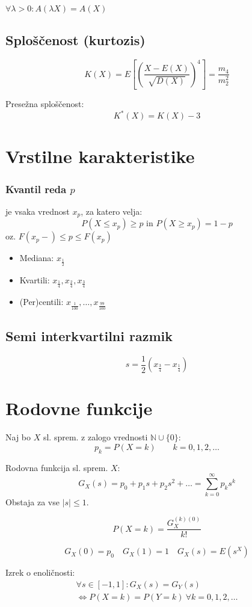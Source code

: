 \begin{multicols}{5}
$\forall \lambda > 0: A(\lambda X) = A(X)$

\subsection{Sploščenost (kurtozis)}
\[ K(X) = E\left[ \left( \frac{X-E(X)}{\sqrt{D(X)}}\right)^4\right] = \frac{m_4}{m_2^2}\]

Presežna sploščenost:
\[ K^*(X) = K(X) - 3\]

\section{Vrstilne karakteristike}

\subsubsection{Kvantil reda $p$}
je vsaka vrednost $x_p$, za katero velja:
\[ P(X \leq x_p) \geq p \text{ in } P(X \geq x_p) = 1 - p \]
oz. $F(x_p-) \leq p \leq F(x_p)$

\begin{itemize}
	\item Mediana: $x_{\frac{1}{2}}$
	\item Kvartili: $x_{\frac{1}{4}}, x_{\frac{2}{4}}, x_{\frac{3}{4}}$
	\item (Per)centili: $x_{\frac{1}{100}}, \dots, x_{\frac{99}{100}}$
\end{itemize}

\subsection{Semi interkvartilni razmik}
\[ s = \frac{1}{2}\left(x_{\frac{3}{4}} - x_{\frac{1}{4}} \right)\]

\section{Rodovne funkcije}
Naj bo $X$ sl. sprem. z zalogo vrednosti $\mathbb{N} \cup \{0\}$: 
\[ p_k = P(X=k) \qquad k = 0,1,2,\dots \]

Rodovna funkcija sl. sprem. $X$:
\[G_X(s) = p_0 + p_1 s + p_2 s^2 + \dots = \sum_{k=0}^\infty p_k s^k \]
Obstaja za vse $|s| \leq 1$.

\[ P(X=k) = \frac{G_X^{(k)(0)}}{k!} \]

\[ G_X(0) = p_0 \quad G_X(1) = 1 \quad G_X(s) = E(s^X) \]

Izrek o enoličnosti:
\begin{multline*}
\forall s \in [-1, 1]: G_X(s) = G_Y(s) \\
\iff P(X=k) = P(Y=k)\ \forall k = 0, 1, 2, \dots
\end{multline*}


\end{multicols}
